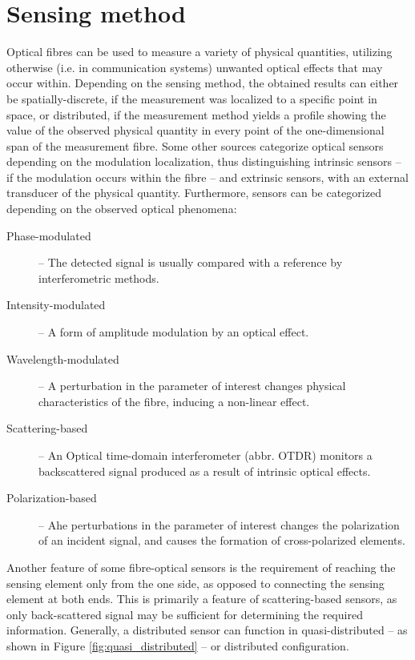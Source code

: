 \documentclass{standalone}
\begin{document}
\chapter{Sensing method}
\setcounter{page}\thestranica


Optical fibres can be used to measure a variety of physical quantities, utilizing otherwise (i.e. in communication systems) unwanted optical effects that may occur within. Depending on the sensing method, the obtained results can either be spatially-discrete, if the measurement was localized to a specific point in space, or distributed, if the measurement method yields a profile showing the value of the observed physical quantity in every point of the one-dimensional span of the measurement fibre. Some other sources categorize optical sensors depending on the modulation localization, thus distinguishing intrinsic sensors -- if the modulation occurs within the fibre -- and extrinsic sensors, with an external transducer of the physical quantity. Furthermore, sensors can be categorized depending on the observed optical phenomena:
\begin{description}
	\item[Phase-modulated] -- The detected signal is usually compared with a reference by interferometric methods.
	\item[Intensity-modulated] -- A form of amplitude modulation by an optical effect.
	\item[Wavelength-modulated] -- A perturbation in the parameter of interest changes physical characteristics of the fibre, inducing a non-linear effect.
	\item[Scattering-based] -- An Optical time-domain interferometer (abbr. OTDR) monitors a backscattered signal produced as a result of intrinsic optical effects.
	\item[Polarization-based] -- Ahe perturbations in the parameter of interest changes the polarization of an incident signal, and causes the formation of cross-polarized elements.
\end{description}
Another feature of some fibre-optical sensors is the requirement of reaching the sensing element only from the one side, as opposed to connecting the sensing element at both ends. This is primarily a feature of scattering-based sensors, as only back-scattered signal may be sufficient for determining the required information. Generally, a distributed sensor can function in quasi-distributed -- as shown in Figure \ref{fig:quasi_distributed} -- or distributed configuration.
\end{document}
